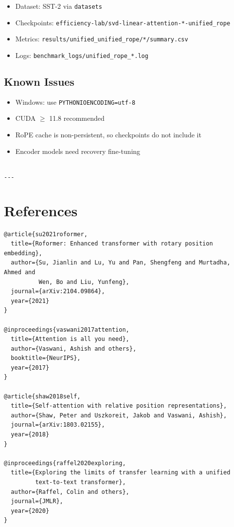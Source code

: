 {\begin{itemize}
\item Dataset: SST-2 via \texttt{datasets}
\item Checkpoints: \texttt{efficiency-lab/svd-linear-attention-*-unified\_rope}
\item Metrics: \texttt{results/unified\_unified\_rope/*/summary.csv}
\item Logs: \texttt{benchmark\_logs/unified\_rope\_*.log}

\end{itemize}
\subsection{Known Issues}

\begin{itemize}
\item Windows: use \texttt{PYTHONIOENCODING=utf-8}
\item CUDA $\ge$ 11.8 recommended
\item RoPE cache is non-persistent, so checkpoints do not include it
\item Encoder models need recovery fine-tuning
\end{itemize}
\begin{lstlisting}

---
\end{lstlisting}


\section{References}

\begin{lstlisting}
@article{su2021roformer,
  title={Roformer: Enhanced transformer with rotary position embedding},
  author={Su, Jianlin and Lu, Yu and Pan, Shengfeng and Murtadha, Ahmed and 
          Wen, Bo and Liu, Yunfeng},
  journal={arXiv:2104.09864},
  year={2021}
}

@inproceedings{vaswani2017attention,
  title={Attention is all you need},
  author={Vaswani, Ashish and others},
  booktitle={NeurIPS},
  year={2017}
}

@article{shaw2018self,
  title={Self-attention with relative position representations},
  author={Shaw, Peter and Uszkoreit, Jakob and Vaswani, Ashish},
  journal={arXiv:1803.02155},
  year={2018}
}

@inproceedings{raffel2020exploring,
  title={Exploring the limits of transfer learning with a unified 
         text-to-text transformer},
  author={Raffel, Colin and others},
  journal={JMLR},
  year={2020}
}


\end{lstlisting}}
